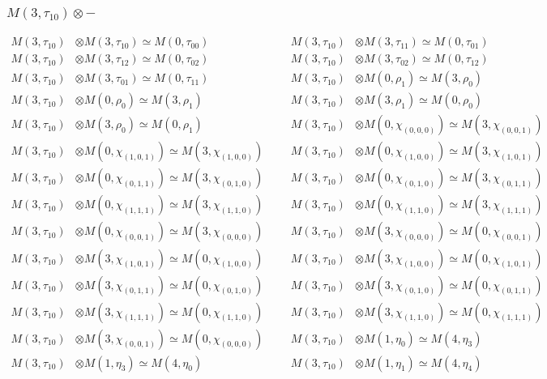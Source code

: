 \subsubsection{$ M(3,\tau_{10})\otimes -$}
\begin{align*}
M(3,\tau_{10}) &\otimes M(3,\tau_{10}) \simeq M(0,\tau_{00}) &&& M(3,\tau_{10}) &\otimes M(3,\tau_{11}) \simeq M(0,\tau_{01})\\
M(3,\tau_{10}) &\otimes M(3,\tau_{12}) \simeq M(0,\tau_{02}) &&& M(3,\tau_{10}) &\otimes M(3,\tau_{02}) \simeq M(0,\tau_{12})\\
M(3,\tau_{10}) &\otimes M(3,\tau_{01}) \simeq M(0,\tau_{11}) &&& M(3,\tau_{10}) &\otimes M(0,\rho_{1}) \simeq M(3,\rho_{0})\\
M(3,\tau_{10}) &\otimes M(0,\rho_{0}) \simeq M(3,\rho_{1}) &&& M(3,\tau_{10}) &\otimes M(3,\rho_{1}) \simeq M(0,\rho_{0})\\
M(3,\tau_{10}) &\otimes M(3,\rho_{0}) \simeq M(0,\rho_{1}) &&& M(3,\tau_{10}) &\otimes M(0,\chi_{(0,0,0)}) \simeq M(3,\chi_{(0,0,1)})\\
M(3,\tau_{10}) &\otimes M(0,\chi_{(1,0,1)}) \simeq M(3,\chi_{(1,0,0)}) &&& M(3,\tau_{10}) &\otimes M(0,\chi_{(1,0,0)}) \simeq M(3,\chi_{(1,0,1)})\\
M(3,\tau_{10}) &\otimes M(0,\chi_{(0,1,1)}) \simeq M(3,\chi_{(0,1,0)}) &&& M(3,\tau_{10}) &\otimes M(0,\chi_{(0,1,0)}) \simeq M(3,\chi_{(0,1,1)})\\
M(3,\tau_{10}) &\otimes M(0,\chi_{(1,1,1)}) \simeq M(3,\chi_{(1,1,0)}) &&& M(3,\tau_{10}) &\otimes M(0,\chi_{(1,1,0)}) \simeq M(3,\chi_{(1,1,1)})\\
M(3,\tau_{10}) &\otimes M(0,\chi_{(0,0,1)}) \simeq M(3,\chi_{(0,0,0)}) &&& M(3,\tau_{10}) &\otimes M(3,\chi_{(0,0,0)}) \simeq M(0,\chi_{(0,0,1)})\\
M(3,\tau_{10}) &\otimes M(3,\chi_{(1,0,1)}) \simeq M(0,\chi_{(1,0,0)}) &&& M(3,\tau_{10}) &\otimes M(3,\chi_{(1,0,0)}) \simeq M(0,\chi_{(1,0,1)})\\
M(3,\tau_{10}) &\otimes M(3,\chi_{(0,1,1)}) \simeq M(0,\chi_{(0,1,0)}) &&& M(3,\tau_{10}) &\otimes M(3,\chi_{(0,1,0)}) \simeq M(0,\chi_{(0,1,1)})\\
M(3,\tau_{10}) &\otimes M(3,\chi_{(1,1,1)}) \simeq M(0,\chi_{(1,1,0)}) &&& M(3,\tau_{10}) &\otimes M(3,\chi_{(1,1,0)}) \simeq M(0,\chi_{(1,1,1)})\\
M(3,\tau_{10}) &\otimes M(3,\chi_{(0,0,1)}) \simeq M(0,\chi_{(0,0,0)}) &&& M(3,\tau_{10}) &\otimes M(1,\eta_{0}) \simeq M(4,\eta_{3})\\
M(3,\tau_{10}) &\otimes M(1,\eta_{3}) \simeq M(4,\eta_{0}) &&& M(3,\tau_{10}) &\otimes M(1,\eta_{1}) \simeq M(4,\eta_{4})\\

\end{align*}
